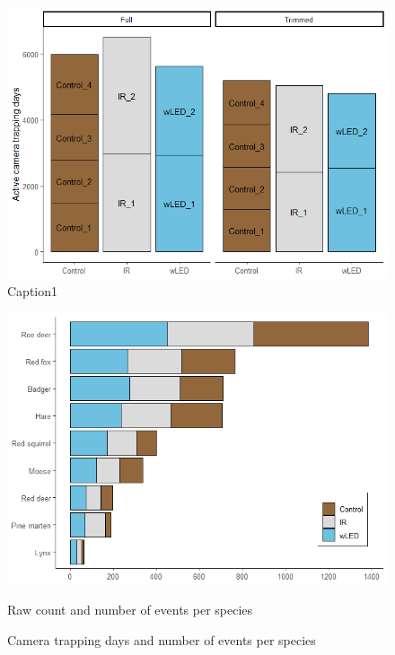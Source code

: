\begin{figure}[ht]
\includegraphics[width=0.9\linewidth]{../R/glmm_sp_files/figure-html/active-days-3.png} 
	\caption{Caption1}
	\label{fig:wrapfig}
\end{figure}


\begin{figure}
 \centering
	\includegraphics[scale=.4]{../R/glmm_sp_files/figure-html/events-1.png}
 \caption[Raw count and number of events per species]
 {Raw count and number of events per species}
\caption{Camera trapping days and number of events per species}
\label{fig:events}
\end{figure}


